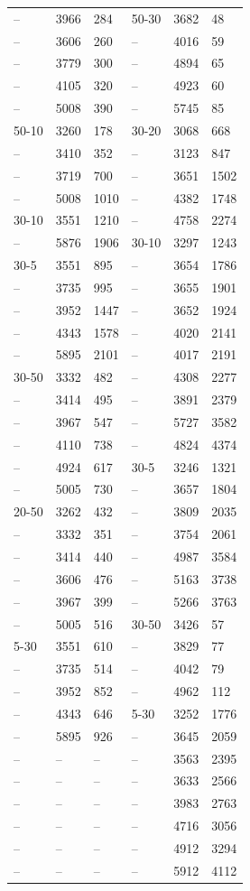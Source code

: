 \begin{xltabular}{0.9\textwidth}{YYYYYY}
    -- & 3966 & 284 & 50-30 & 3682 & 48\\
    -- & 3606 & 260 & -- & 4016 & 59\\
    -- & 3779 & 300 & -- & 4894 & 65\\
    -- & 4105 & 320 & -- & 4923 & 60\\
    -- & 5008 & 390 & -- & 5745 & 85\\
    50-10 & 3260 & 178 & 30-20 & 3068 & 668\\
    -- & 3410 & 352 & -- & 3123 & 847\\
    -- & 3719 & 700 & -- & 3651 & 1502\\
    -- & 5008 & 1010 & -- & 4382 & 1748\\
    30-10 & 3551 & 1210 & -- & 4758 & 2274\\
    -- & 5876 & 1906 & 30-10 & 3297 & 1243\\
    30-5 & 3551 & 895 & -- & 3654 & 1786\\
    -- & 3735 & 995 & -- & 3655 & 1901\\
    -- & 3952 & 1447 & -- & 3652 & 1924\\
    -- & 4343 & 1578 & -- & 4020 & 2141\\
    -- & 5895 & 2101 & -- & 4017 & 2191\\
    30-50 & 3332 & 482 & -- & 4308 & 2277\\
    -- & 3414 & 495 & -- & 3891 & 2379\\
    -- & 3967 & 547 & -- & 5727 & 3582\\
    -- & 4110 & 738 & -- & 4824 & 4374\\
    -- & 4924 & 617 & 30-5 & 3246 & 1321\\
    -- & 5005 & 730 & -- & 3657 & 1804\\
    20-50 & 3262 & 432 & -- & 3809 & 2035\\
    -- & 3332 & 351 & -- & 3754 & 2061\\
    -- & 3414 & 440 & -- & 4987 & 3584\\
    -- & 3606 & 476 & -- & 5163 & 3738\\
    -- & 3967 & 399 & -- & 5266 & 3763\\
    -- & 5005 & 516 & 30-50 & 3426 & 57\\
    5-30 & 3551 & 610 & -- & 3829 & 77\\
    -- & 3735 & 514 & -- & 4042 & 79\\
    -- & 3952 & 852 & -- & 4962 & 112\\
    -- & 4343 & 646 & 5-30 & 3252 & 1776\\
    -- & 5895 & 926 & -- & 3645 & 2059\\
    -- & -- & -- & -- & 3563 & 2395\\
    -- & -- & -- & -- & 3633 & 2566\\
    -- & -- & -- & -- & 3983 & 2763\\
    -- & -- & -- & -- & 4716 & 3056\\
    -- & -- & -- & -- & 4912 & 3294\\
    -- & -- & -- & -- & 5912 & 4112\\
    

\end{xltabular}
